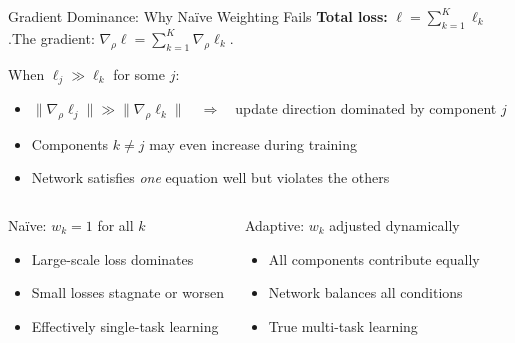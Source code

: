\documentclass[aspectratio=169,11pt]{beamer}
\newcommand{\emphc}[1]{\textcolor{harvardcrimson}{#1}}
\begin{document}
\begin{frame}{Gradient Dominance: Why Na\"ive Weighting Fails}
\textbf{Total loss:} $\ell = \sum_{k=1}^K \ell_k$.\quad The gradient: $\nabla_\rho \ell = \sum_{k=1}^K \nabla_\rho \ell_k$.

\vspace{0.3em}
When $\ell_j \gg \ell_k$ for some $j$:
\begin{itemize}\itemsep1pt
    \item $\|\nabla_\rho \ell_j\| \gg \|\nabla_\rho \ell_k\|$~~$\Rightarrow$~~update direction dominated by component $j$
    \item Components $k \neq j$ may even \emphc{increase} during training
    \item Network satisfies \emph{one} equation well but violates the others
\end{itemize}

\vspace{0.3em}
\begin{columns}[T]
\begin{alertblock}{Na\"ive: $w_k = 1$ for all $k$}
\begin{itemize}\itemsep1pt
    \item Large-scale loss dominates
    \item Small losses stagnate or worsen
    \item Effectively single-task learning
\end{itemize}
\end{alertblock}

\begin{exampleblock}{Adaptive: $w_k$ adjusted dynamically}
\begin{itemize}\itemsep1pt
    \item All components contribute equally
    \item Network balances all conditions
    \item True multi-task learning
\end{itemize}
\end{exampleblock}
\end{columns}
\end{frame}
\end{document}
